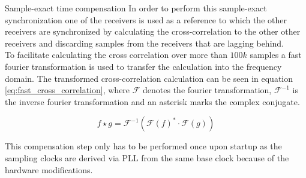 \begin{subchapter}{Sample-exact time compensation}
  In order to perform this sample-exact synchronization
  one of the receivers is used as a reference to which
  the other receivers are synchronized by calculating the
  cross-correlation to the other other receivers and discarding
  samples from the receivers that are lagging behind. \\

  To facilitate calculating the cross correlation over
  more than $100k$ samples a fast fourier transformation
  is used to transfer the calculation into the frequency domain.
  The transformed cross-correlation calculation can be
  seen in equation \ref{eq:fast_cross_correlation}, where
  $\mathcal{F}$ denotes the fourier transformation,
  $\mathcal{F}^{-1}$ is the inverse fourier transformation
  and an asterisk marks the complex conjugate.

  \begin{equation}
    \label{eq:fast_cross_correlation}
    f \star g = \mathcal{F}^{-1}\left(
      \mathcal{F}\left( f \right)^{\ast}
      \cdot
      \mathcal{F}\left( g \right)
    \right)
  \end{equation}

  This compensation step only has to be performed
  once upon startup as the sampling clocks are
  derived via PLL from the same base clock because
  of the hardware modifications.
\end{subchapter}

